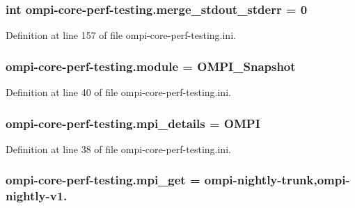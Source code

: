 \hypertarget{namespaceompi-core-perf-testing_ac489ea5e767b62f66a2b4a1b28758af2}{
\subsubsection[{merge\-\_\-stdout\-\_\-stderr}]{\setlength{\rightskip}{0pt plus 5cm}int ompi-\/core-\/perf-\/testing.\-merge\-\_\-stdout\-\_\-stderr = 0}}\label{namespaceompi-core-perf-testing_ac489ea5e767b62f66a2b4a1b28758af2}


Definition at line 157 of file ompi-\/core-\/perf-\/testing.\-ini.

\hypertarget{namespaceompi-core-perf-testing_a9cf3e97fe87ca3ae3174f504ca0003fd}{
\subsubsection[{module}]{\setlength{\rightskip}{0pt plus 5cm}ompi-\/core-\/perf-\/testing.\-module = O\-M\-P\-I\-\_\-\-Snapshot}}\label{namespaceompi-core-perf-testing_a9cf3e97fe87ca3ae3174f504ca0003fd}


Definition at line 40 of file ompi-\/core-\/perf-\/testing.\-ini.

\hypertarget{namespaceompi-core-perf-testing_a0afffa64305d9b33cce67b295a7b6162}{
\subsubsection[{mpi\-\_\-details}]{\setlength{\rightskip}{0pt plus 5cm}ompi-\/core-\/perf-\/testing.\-mpi\-\_\-details = O\-M\-P\-I}}\label{namespaceompi-core-perf-testing_a0afffa64305d9b33cce67b295a7b6162}


Definition at line 38 of file ompi-\/core-\/perf-\/testing.\-ini.

\hypertarget{namespaceompi-core-perf-testing_ad9dbd4d743b90d239ba06813eeb50181}{
\subsubsection[{mpi\-\_\-get}]{\setlength{\rightskip}{0pt plus 5cm}ompi-\/core-\/perf-\/testing.\-mpi\-\_\-get = ompi-\/nightly-\/trunk,ompi-\/nightly-\/v1.}}\label{namespaceompi-core-perf-testing_ad9dbd4d743b90d239ba06813eeb50181}



